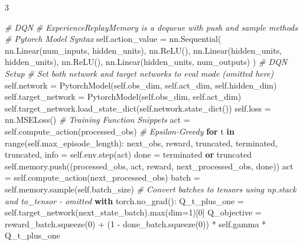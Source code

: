 \documentclass{article}
\newenvironment{Shaded}{\CodeFontSize\setlength{\topsep}{\CodeBlockSkip}\setlength{\partopsep}{0pt}}{}
\newcommand{\BuiltInTok}[1]{\textcolor[rgb]{0.00,0.50,0.00}{#1}}
\newcommand{\CommentTok}[1]{\textcolor[rgb]{0.38,0.63,0.69}{\textit{#1}}}
\newcommand{\ControlFlowTok}[1]{\textcolor[rgb]{0.00,0.44,0.13}{\textbf{#1}}}
\newcommand{\DecValTok}[1]{\textcolor[rgb]{0.25,0.63,0.44}{#1}}
\newcommand{\KeywordTok}[1]{\textcolor[rgb]{0.00,0.44,0.13}{\textbf{#1}}}
\newcommand{\NormalTok}[1]{#1}
\newcommand{\OperatorTok}[1]{\textcolor[rgb]{0.40,0.40,0.40}{#1}}
\newcommand{\VariableTok}[1]{\textcolor[rgb]{0.10,0.09,0.49}{#1}}
\newcommand{\CodeFontSize}{\fontsize{4.8}{5.6}\selectfont}
\newcommand{\NumColumns}{3}  %
\newlength{\CodeBlockSkip}
\begin{document}
\begin{multicols*}{\NumColumns}
\begin{Shaded}
\begin{Highlighting}[]
\CommentTok{\# DQN}
\CommentTok{\# ExperienceReplayMemory is a dequeue with push and sample methods}
\CommentTok{\# Pytorch Model Syntax}
\VariableTok{self}\NormalTok{.action\_value }\OperatorTok{=}\NormalTok{ nn.Sequential(}
\NormalTok{  nn.Linear(num\_inputs, hidden\_units),}
\NormalTok{  nn.ReLU(),}
\NormalTok{  nn.Linear(hidden\_units, hidden\_units),}
\NormalTok{  nn.ReLU(),}
\NormalTok{  nn.Linear(hidden\_units, num\_outputs)}
\NormalTok{)}
\CommentTok{\# DQN Setup}
\CommentTok{\# Set both network and target networks to eval mode (omitted here)}
\VariableTok{self}\NormalTok{.network }\OperatorTok{=}\NormalTok{ PytorchModel(}\VariableTok{self}\NormalTok{.obs\_dim, }\VariableTok{self}\NormalTok{.act\_dim, }\VariableTok{self}\NormalTok{.hidden\_dim)}
\VariableTok{self}\NormalTok{.target\_network }\OperatorTok{=}\NormalTok{ PytorchModel(}\VariableTok{self}\NormalTok{.obs\_dim, }\VariableTok{self}\NormalTok{.act\_dim)}
\VariableTok{self}\NormalTok{.target\_network.load\_state\_dict(}\VariableTok{self}\NormalTok{.network.state\_dict())}
\VariableTok{self}\NormalTok{.loss }\OperatorTok{=}\NormalTok{ nn.MSELoss()}
\CommentTok{\# Training Function Snippets}
\NormalTok{act }\OperatorTok{=} \VariableTok{self}\NormalTok{.compute\_action(processed\_obs) }\CommentTok{\# Epsilon{-}Greedy}
\ControlFlowTok{for}\NormalTok{ t }\KeywordTok{in} \BuiltInTok{range}\NormalTok{(}\VariableTok{self}\NormalTok{.max\_episode\_length):}
\NormalTok{  next\_obs, reward, truncated, terminated, truncated, info }\OperatorTok{=} \VariableTok{self}\NormalTok{.env.step(act)}
\NormalTok{  done }\OperatorTok{=}\NormalTok{ terminated }\KeywordTok{or}\NormalTok{ truncated}
  \VariableTok{self}\NormalTok{.memory.push((processed\_obs, act, reward, next\_processed\_obs, done))}
\NormalTok{  act }\OperatorTok{=} \VariableTok{self}\NormalTok{.compute\_action(next\_processed\_obs)}
\NormalTok{  batch }\OperatorTok{=} \VariableTok{self}\NormalTok{.memory.sample(}\VariableTok{self}\NormalTok{.batch\_size)}
  \CommentTok{\# Convert batches to tensors using np.stack and to\_tensor {-} omitted}
  \ControlFlowTok{with}\NormalTok{ torch.no\_grad():}
\NormalTok{    Q\_t\_plus\_one }\OperatorTok{=} \VariableTok{self}\NormalTok{.target\_network(next\_state\_batch).}\BuiltInTok{max}\NormalTok{(dim}\OperatorTok{=}\DecValTok{1}\NormalTok{)[}\DecValTok{0}\NormalTok{] }
\NormalTok{    Q\_objective }\OperatorTok{=}\NormalTok{ reward\_batch.squeeze(}\DecValTok{0}\NormalTok{) }\OperatorTok{+}\NormalTok{ (}\DecValTok{1} \OperatorTok{{-}}\NormalTok{ done\_batch.squeeze(}\DecValTok{0}\NormalTok{)) }\OperatorTok{*} \VariableTok{self}\NormalTok{.gamma }\OperatorTok{*}\NormalTok{ Q\_t\_plus\_one}
  

\end{Highlighting}
\end{Shaded}
\end{multicols*}
\end{document}
